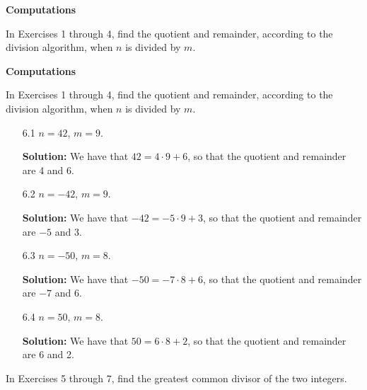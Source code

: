 \noindent      \textbf{Computations}

\noindent      In Exercises 1 through 4, find the quotient and remainder,
               according to the division algorithm, when $n$ is divided by $m$.

\noindent      \textbf{Computations}

\noindent      In Exercises 1 through 4, find the quotient and remainder,
               according to the division algorithm, when $n$ is divided by $m$.

\begin{enumerate}
   \item[6.1]  $n = 42$, $m = 9$.
   
      \textbf{Solution:} We have that $42 = 4 \cdot 9 + 6$, so that the
      quotient and remainder are 4 and 6.
   \item[6.2]  $n = -42$, $m = 9$.
   
      \textbf{Solution:} We have that $-42 = -5 \cdot 9 + 3$, so that the
      quotient and remainder are $-5$ and 3.
   \item[6.3]  $n = -50$, $m = 8$.
   
      \textbf{Solution:} We have that $-50 = -7 \cdot 8 + 6$, so that the
      quotient and remainder are $-7$ and 6.
   \item[6.4]  $n = 50$, $m = 8$.
   
      \textbf{Solution:} We have that $50 = 6 \cdot 8 + 2$, so that the
      quotient and remainder are 6 and 2.
\end{enumerate}

\noindent      In Exercises 5 through 7, find the greatest common divisor of the
               two integers.

